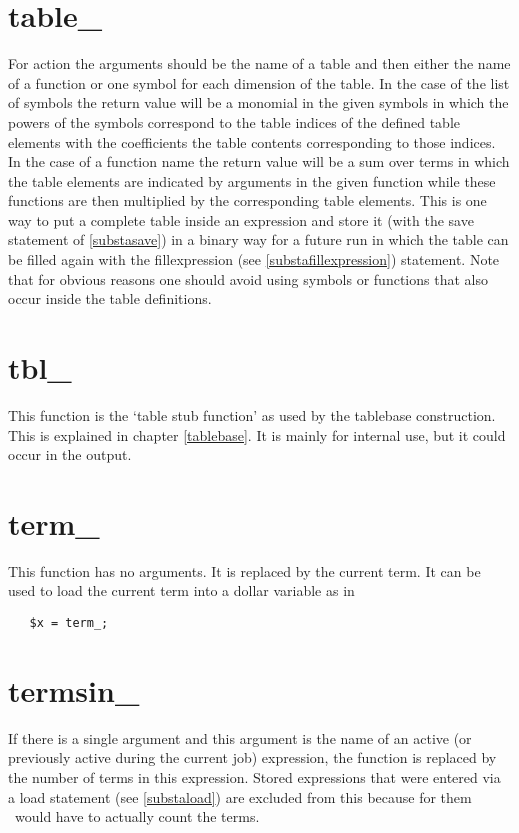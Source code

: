 \section{table\_}
\label{funtable}
\noindent For action the arguments should be the name of a table and then 
either the name of a function or one symbol for each dimension of the 
table. In the case of the list of symbols the return value will be a 
monomial in the given symbols in which the powers of the symbols correspond 
to the table indices of the defined table elements with the coefficients 
the table contents corresponding to those indices. In the case of a 
function name the return value will be a sum over terms in which the table 
elements are indicated by arguments in the given function while these 
functions are then multiplied by the corresponding table elements. This is 
one way to put a complete table inside an expression and store it (with the 
save statement of \ref{substasave}) in a binary way for a future run in 
which the table can be filled again with the 
fillexpression (see \ref{substafillexpression}) 
statement. Note that for obvious reasons one should avoid using symbols or 
functions that also occur inside the table definitions.


\section{tbl\_}
\label{funtbl}
\noindent This function is the `table stub function' as used by the 
tablebase construction. This is explained in chapter 
\ref{tablebase}. It is mainly for internal use, but it could occur in the 
output.


\section{term\_}
\label{funterm}
\noindent This function has no arguments. It is replaced by the current 
term. It can be used to load the current term into a dollar variable as in
\begin{verbatim}
   $x = term_;
\end{verbatim}


\section{termsin\_}
\label{funtermsin}
\noindent If there is a single argument and this argument is the name of an 
active (or previously active during the current job) expression, the 
function is replaced by the number of terms in this 
expression. Stored expressions that were entered via a load statement (see 
\ref{substaload}) are excluded from this because for them \FORM\ would have 
to actually count the terms.

